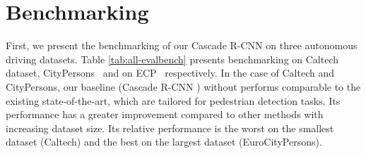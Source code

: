 \documentclass[final]{cvpr}
\newcommand{\caltech}[1]{{Caltech~\cite{dollar2012pedestrian}}}
\newcommand{\cityperson}[1]{{CityPersons~\cite{zhang2017citypersons}}}
\newcommand{\ecp}[1]{{ECP~\cite{braun2018eurocity}}}
\newcommand{\caltecha}[1]{{Caltech}}
\newcommand{\citypersona}[1]{{CityPersons}}
\begin{document}
 \section{Benchmarking}
\label{sec:bench}
\vspace{-2mm}
First, we present the benchmarking of our Cascade R-CNN \cite{cai2019cascade} on three autonomous driving datasets. 
Table \ref{tab:all-evalbench} presents benchmarking on \caltech{} dataset, \cityperson{} and on \ecp{} respectively. In the case of \caltecha{} and \citypersona{}, our baseline (Cascade R-CNN \cite{cai2019cascade}) without  performs comparable to the existing state-of-the-art, which are tailored for pedestrian detection tasks. 
Its performance has a greater improvement compared to other methods with increasing dataset size.
Its relative performance is the worst on the smallest dataset (Caltech) and the best on the largest dataset (EuroCityPersons).
\end{document}
